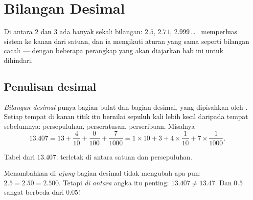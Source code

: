 \chapter{Bilangan Desimal}\label{ch:g6:decimals}

Di antara $2$ dan $3$ ada banyak sekali bilangan: $2.5$, $2.71$,
$2.999$\,\dots\  memperluas sistem  ke
kanan dari satuan, dan ia mengikuti aturan yang sama seperti bilangan
cacah --- dengan beberapa perangkap yang akan diajarkan bab ini untuk
dihindari.

\section{Penulisan desimal}

\begin{definition}\label{def:g6:decimals:places}
\emph{Bilangan desimal} punya bagian bulat dan
bagian desimal, yang dipisahkan oleh . Setiap tempat di
kanan titik itu bernilai sepuluh kali lebih kecil daripada tempat
sebelumnya: persepuluhan, perseratusan, perseribuan. Misalnya
\[
13.407 = 13 + \frac{4}{10} + \frac{0}{100} + \frac{7}{1000}
= 1 \times 10 + 3 + 4 \times \frac{1}{10} + 7 \times \frac{1}{1000}.
\]
\end{definition}

\begin{omfigure}

{\small Tabel  dari $13.407$:  terletak
di antara satuan dan persepuluhan.}
\end{omfigure}

\begin{remark}
Menambahkan  di \emph{ujung} bagian desimal tidak mengubah apa pun:
$2.5 = 2.50 = 2.500$. Tetapi  \emph{di antara} angka itu penting:
$13.407 \neq 13.47$. Dan $0.5$ sangat berbeda dari $0.05$!
\end{remark}

